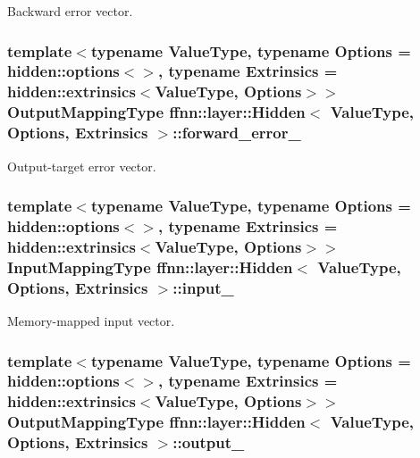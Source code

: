 Backward error vector. 

\hypertarget{classffnn_1_1layer_1_1_hidden_a1abba7440bdde56f49673de2acf58b30}{
\subsubsection[{forward\-\_\-error\-\_\-}]{\setlength{\rightskip}{0pt plus 5cm}template$<$typename Value\-Type, typename Options = hidden\-::options$<$$>$, typename Extrinsics = hidden\-::extrinsics$<$\-Value\-Type, Options$>$$>$ {\bf Output\-Mapping\-Type} {\bf ffnn\-::layer\-::\-Hidden}$<$ Value\-Type, Options, Extrinsics $>$\-::forward\-\_\-error\-\_\-\hspace{0.3cm}{\ttfamily [protected]}}}\label{classffnn_1_1layer_1_1_hidden_a1abba7440bdde56f49673de2acf58b30}


Output-\/target error vector. 

\hypertarget{classffnn_1_1layer_1_1_hidden_afe2644f671f711cf0ca1357621dfc3a6}{
\subsubsection[{input\-\_\-}]{\setlength{\rightskip}{0pt plus 5cm}template$<$typename Value\-Type, typename Options = hidden\-::options$<$$>$, typename Extrinsics = hidden\-::extrinsics$<$\-Value\-Type, Options$>$$>$ {\bf Input\-Mapping\-Type} {\bf ffnn\-::layer\-::\-Hidden}$<$ Value\-Type, Options, Extrinsics $>$\-::input\-\_\-\hspace{0.3cm}{\ttfamily [protected]}}}\label{classffnn_1_1layer_1_1_hidden_afe2644f671f711cf0ca1357621dfc3a6}


Memory-\/mapped input vector. 

\hypertarget{classffnn_1_1layer_1_1_hidden_a118c5ecea99dc243573c981f26d53fc6}{
\subsubsection[{output\-\_\-}]{\setlength{\rightskip}{0pt plus 5cm}template$<$typename Value\-Type, typename Options = hidden\-::options$<$$>$, typename Extrinsics = hidden\-::extrinsics$<$\-Value\-Type, Options$>$$>$ {\bf Output\-Mapping\-Type} {\bf ffnn\-::layer\-::\-Hidden}$<$ Value\-Type, Options, Extrinsics $>$\-::output\-\_\-\hspace{0.3cm}{\ttfamily [protected]}}}\label{classffnn_1_1layer_1_1_hidden_a118c5ecea99dc243573c981f26d53fc6}


